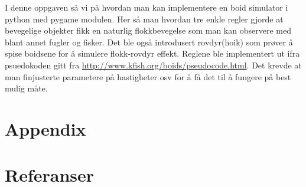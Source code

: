 {I denne oppgaven så vi på hvordan man kan implementere en boid simulator i python med pygame modulen. Her så man hvordan tre enkle regler gjorde at bevegelige objekter fikk en naturlig flokkbevegelse som man kan observere med blant annet fugler og fisker. Det ble også introdusert rovdyr(hoik) som prøver å spise boidsene for å simulere flokk-rovdyr effekt. Reglene ble implementert ut ifra psuedokoden gitt fra \url{http://www.kfish.org/boids/pseudocode.html}. Det krevde at man finjusterte parametere på hastigheter osv for å få det til å fungere på best mulig måte.





\newpage
\section{Appendix}
\section{Referanser}
\begingroup
\renewcommand{\section}[2]{}%


\endgroup



 







